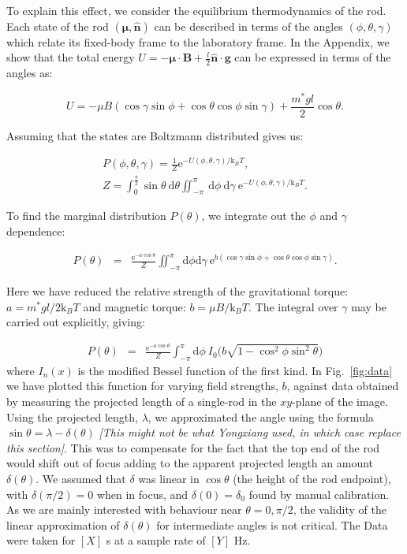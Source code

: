\documentclass[aps,prl,twocolumn,superscriptaddress]{revtex4-1}
\newcommand{\vcrm}[1]{\mathbf{#1}}
\newcommand{\hvcrm}[1]{\mathbf{\hat{#1}}}
\newcommand{\vc}[1]{\boldsymbol{#1}}
\newcommand{\ssc}[0]{\sin{\gamma}}
\newcommand{\ccc}[0]{\cos{\gamma}}
\newcommand{\sst}[0]{\sin{\theta}}
\newcommand{\cct}[0]{\cos{\theta}}
\newcommand{\ssp}[0]{\sin{\phi}}
\newcommand{\ccp}[0]{\cos{\phi}}
\newcommand{\dd}{\mathrm{d}}
\newcommand{\ee}{\mathrm{e}}
\newcommand{\kk}{\mathrm{k}_B}
\newcommand{\vm}{\vc{\mu}}
\newcommand{\vn}{\hvcrm{n}}
\newcommand{\vB}{\vcrm{B}}
\begin{document}
To explain this effect, we consider the equilibrium thermodynamics of the rod. Each state of the rod $(\vm,\vn)$ can be described in terms of the angles $(\phi, \theta, \gamma)$ which relate its fixed-body frame to the laboratory frame. In the Appendix, we show that the total energy $U = -\vm \cdot\vB + \frac{l}{2} \vn \cdot \vcrm{g}$ can be expressed in terms of the angles as:

\begin{equation}
U = -\mu B (\ccc\ssp + \cct\ccp\ssc) + \frac{m^*gl}{2} \cct.
\end{equation}

Assuming that the states are Boltzmann distributed gives us:

\begin{eqnarray}
P(\phi, \theta, \gamma)  =  \frac{1}{Z} \ee^{ -U(\phi, \theta, \gamma)/\kk T }, \\
Z  =  \int_0^{\frac{\pi}{2}} \sst\ \dd\theta \iint_{-\pi}^{\pi}\ \dd\phi\ \dd\gamma \ \ee^{ -U(\phi, \theta, \gamma)/\kk T }.
\end{eqnarray}

To find the marginal distribution $P(\theta)$, we integrate out the $\phi$ and $\gamma$ dependence:

\begin{eqnarray}
P(\theta)  & = & \frac{\ee^{-a\cos\theta}}{Z} \iint_{-\pi}^{\pi} \dd\phi \dd\gamma \  \ee^{b(\ccc\ssp + \cct\ccp\ssc) }.
\end{eqnarray}

Here we have reduced the relative strength of the gravitational torque: $a=m^*gl/2 \kk T$ and magnetic torque: $b=\mu B/\kk T$. The integral over $\gamma$ may be carried out explicitly, giving:

\begin{eqnarray}
P(\theta)  & = & \frac{\ee^{-a\cos\theta}}{Z} \int_{-\pi}^{\pi}\dd\phi\ I_0\Big( b\sqrt{1-\cos^2\phi\sin^2\theta} \Big)
\end{eqnarray}where $I_n(x)$ is the modified Bessel function of the first kind. In Fig.\ \ref{fig:data} we have plotted this function for varying field strengths, $b$, against data obtained by measuring the projected length of a single-rod in the $xy$-plane of the image. Using the projected length, $\lambda$, we approximated the angle using the formula $\sin\theta = \lambda - \delta(\theta)$ \emph{[This might not be what Yongxiang used, in which case replace this section]}. This was to compensate for the fact that the top end of the rod would shift out of focus adding to the apparent projected length an amount $\delta(\theta)$. We assumed that $\delta$ was linear in $\cos\theta$ (the height of the rod endpoint), with $\delta(\pi/2)=0$ when in focus, and $\delta(0)=\delta_0$ found by manual calibration. As we are mainly interested with behaviour near $\theta=0,\pi/2$, the validity of the linear approximation of $\delta(\theta)$ for intermediate angles is not critical. The  Data were taken for $[X]$ s at a sample rate of $[Y]$ Hz.
\end{document}
